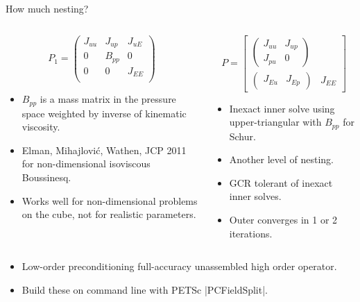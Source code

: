 \begin{frame}{How much nesting?}
  \begin{columns}
    \begin{column}{0.5\textwidth}
      \begin{equation*}
        P_1 =
        \begin{pmatrix}
          J_{uu} & J_{up} & J_{uE} \\
          0 & B_{pp} & 0 \\
          0 & 0 & J_{EE} \\
        \end{pmatrix}
      \end{equation*}
      \begin{itemize}
      \item $B_{pp}$ is a mass matrix in the pressure space weighted by inverse of kinematic viscosity.
      \item Elman, Mihajlovi\'c, Wathen, JCP 2011 for non-dimensional isoviscous Boussinesq.
      \item Works well for non-dimensional problems on the cube, not for realistic parameters.
      \end{itemize}
    \end{column}
    \begin{column}{0.5\textwidth}
      \begin{equation*}
        P =
        \begin{bmatrix}
          \begin{pmatrix}
            J_{uu} & J_{up} \\
            J_{pu} & 0
          \end{pmatrix} & \\
          \begin{pmatrix}
            J_{Eu} & J_{Ep}
          \end{pmatrix}
          & J_{EE}
        \end{bmatrix}
      \end{equation*}
      \begin{itemize}
      \item Inexact inner solve using upper-triangular with $B_{pp}$ for Schur.
      \item Another level of nesting.
      \item GCR tolerant of inexact inner solves.
      \item Outer converges in 1 or 2 iterations.
      \end{itemize}
    \end{column}
  \end{columns}
  \begin{itemize}
  \item Low-order preconditioning full-accuracy unassembled high order operator.
  \item Build these on command line with PETSc \cverb|PCFieldSplit|.
  \end{itemize}
\end{frame}
